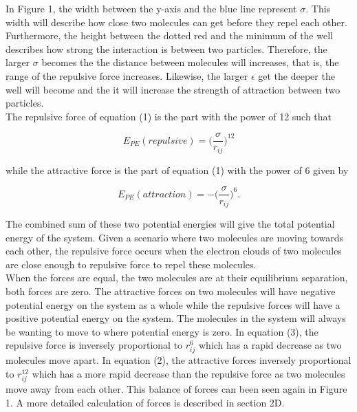 \documentclass[reprint,amsmath,amssymb, aps, 10pt, a4paper, english, reqno]{revtex4-1}
\begin{document}
\begin{multicols}{2}
In Figure 1, the width between the y-axis and the blue line represent $\sigma$. This width will describe how close two  molecules can get before they repel each other. Furthermore, the height between the dotted red and the minimum of the well describes how strong the interaction is between two particles. Therefore, the larger $\sigma$ becomes the the distance between molecules will increases, that is, the range of the repulsive force increases. Likewise, the larger $\epsilon$ get the deeper the well will become and the it will increase the strength of attraction between two particles. \\

The repulsive force of equation (1) is the part with the power of 12 such that

\begin{equation}
E_{PE}(repulsive) = \Bigg(\frac{\sigma}{r_{ij}}\Bigg)^{12} 
\end{equation}

while the attractive force is the part of equation (1) with the power of 6 given by

\begin{equation}
E_{PE}(attraction) = - \Bigg(\frac{\sigma}{r_{ij}}\Bigg)^{6}.
\end{equation}

The combined sum of these two potential energies will give the total potential energy of the system. Given a scenario where two molecules are moving towards each other, the repulsive force occurs when the electron clouds of two molecules are close enough to repulsive force to repel these molecules. \\

When the forces are equal, the two molecules are at their equilibrium separation, both forces are zero. The attractive forces on two molecules will have negative potential energy on the system as a whole while the repulsive forces will have a positive potential energy on the system. The molecules in the system will always be wanting to move to where potential energy is zero. In equation (3), the repulsive force is inversely proportional to $r_{ij}^{6}$ which has a rapid decrease as two molecules move apart. In equation (2), the attractive forces inversely proportional to $r_{ij}^{12}$ which has a more rapid decrease than the repulsive force as two molecules move away from each other. This balance of forces can been seen again in Figure 1. A more detailed calculation of forces is described in section 2D.



\end{multicols}
\end{document}
